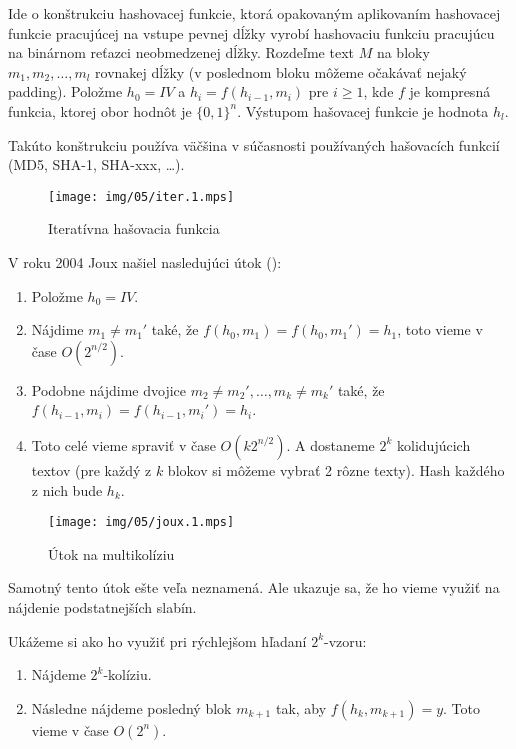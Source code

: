 Ide o konštrukciu hashovacej funkcie, ktorá opakovaným aplikovaním
hashovacej funkcie pracujúcej na vstupe pevnej dĺžky vyrobí hashovaciu
funkciu pracujúcu na binárnom reťazci neobmedzenej dĺžky.
Rozdeľme text $M$ na bloky $m_1, m_2, \dots, m_l$ rovnakej dĺžky
(v poslednom bloku môžeme očakávať nejaký padding).
Položme $h_0 = IV$ a $h_i = f(h_{i-1}, m_i)$ pre $i \geq 1$, kde $f$ 
je kompresná funkcia, ktorej obor hodnôt je $\{0,1\}^n$.
Výstupom hašovacej funkcie je hodnota $h_l$.

Takúto konštrukciu 
používa väčšina v súčasnosti používaných hašovacích funkcií
(MD5, SHA-1, SHA-xxx, \dots).

\begin{figure}[h!]
    \centering
    \texttt{[image: img/05/iter.1.mps]}
    \caption{Iteratívna hašovacia funkcia}
    \label{fig:iter}
\end{figure}


\noindent
V roku 2004 Joux našiel nasledujúci útok (\cite{Joux04}):

\begin{enumerate}
    \itemsep -1.2mm
    \item Položme $h_0 = IV$.

    \item Nájdime $m_1 \neq m_1'$ také, že $f(h_0, m_1) = f(h_0, m_1') = h_1$, 
        toto vieme v čase $O(2^{n/2})$.

    \item Podobne nájdime dvojice $m_2 \neq m_2', \dots, m_k \neq m_k'$ také, 
        že $f(h_{i-1}, m_i) = f(h_{i-1}, m_i') = h_i$.

    \item Toto celé vieme spraviť v čase $O(k 2^{n/2})$. A dostaneme $2^k$ 
        kolidujúcich textov (pre každý z $k$ blokov si môžeme vybrať
        2 rôzne texty). Hash každého z nich bude $h_k$.
\end{enumerate}

\begin{figure}[h!]
    \label{fig:joux1}
    \centering
    \texttt{[image: img/05/joux.1.mps]}
    \caption{Útok na multikolíziu}
\end{figure}


Samotný tento útok ešte veľa neznamená. Ale ukazuje sa, že
ho vieme využiť na nájdenie podstatnejších slabín.

Ukážeme si ako ho využiť pri rýchlejšom hľadaní $2^k$-vzoru:
\begin{enumerate}
    \itemsep -1.2mm

    \item Nájdeme $2^k$-kolíziu.

    \item Následne nájdeme posledný blok $m_{k+1}$ tak,
        aby $f(h_k, m_{k+1}) = y$. Toto vieme v čase $O(2^n)$.
\end{enumerate}

